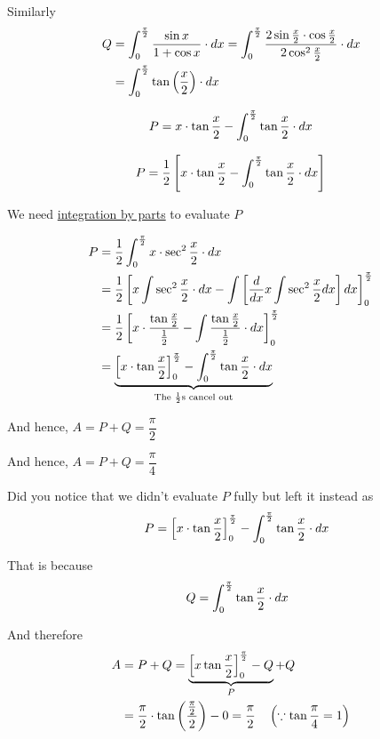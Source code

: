\documentclass[14pt,fleqn]{extarticle}
\begin{document}
Similarly
\begin{align}
Q &= \int_0^{\frac{\pi}{2}} \frac{\sin x}{1+\cos x}\cdot dx = \int_0^{\frac{\pi}{2}} \frac{2\sin\frac{x}{2}\cdot\cos\frac{x}{2}}{2\cos^2 \frac{x}{2}}\cdot dx \\
&= \int_0^{\frac{\pi}{2}} \tan \left(\frac{x}{2} \right)\cdot dx 
\end{align}

\newcard 

\[ P = x\cdot\tan \frac{x}{2} - \int_0^{\frac{\pi}{2}} \tan\frac{x}{2}\cdot dx \]

\newcard 
\[ P = \frac{1}{2} \left[ x\cdot\tan \frac{x}{2} - \int_0^{\frac{\pi}{2}} \tan\frac{x}{2}\cdot dx \right] \]

\newcard 

We need \underline{integration by parts} to evaluate $P$ 

\begin{align}
P &= \frac{1}{2} \int_0^{\frac{\pi}{2}} x\cdot\sec^2\frac{x}{2}\cdot dx \\
&= \frac{1}{2} \left[x\int\sec^2 \frac{x}{2}\cdot dx - \int \left[\frac{d}{dx}x\int\sec^2 \frac{x}{2}  dx\right]dx\right]_0^{\frac{\pi}{2}}  \\
&= \frac{1}{2} \left[x\cdot \frac{\tan\frac{x}{2}}{\frac{1}{2}} - \int\frac{\tan \frac{x}{2}}{\frac{1}{2}}\cdot dx \right]_0^{\frac{\pi}{2}} \\
&= \underbrace{\left[x\cdot\tan\frac{x}{2} \right]_0^{\frac{\pi}{2}} - \int_0^{\frac{\pi}{2}}\tan\frac{x}{2}\cdot dx }_{\text{The $\frac{1}{2}$s cancel out}}
\end{align}

\newcard 

And hence, $A = P + Q = \dfrac\pi{2}$

\newcard 

And hence, $A = P + Q = \dfrac\pi{4}$

\newcard 

Did you notice that we didn't evaluate $P$ fully but left it instead as 
\[ \quad P = \left[x\cdot\tan\frac{x}{2} \right]_0^{\frac{\pi}{2}} - \int_0^{\frac{\pi}{2}} \tan \frac{x}{2}\cdot dx\]

That is because \[\quad Q = \int_0^{\frac{\pi}{2}} \tan \frac{x}{2}\cdot dx \]

And therefore 
\begin{align}
	A &= P + Q = \underbrace{\left[x\tan\frac{x}{2} \right]_0^{\frac{\pi}{2}} - Q}_P + Q \\
	&= \frac{\pi}{2}\cdot\tan \left(\frac{\frac{\pi}{2}}{2} \right) - 0 = \frac{\pi}{2}\quad \left(\because\tan\frac\pi{4} = 1 \right)
\end{align}
\end{document}
